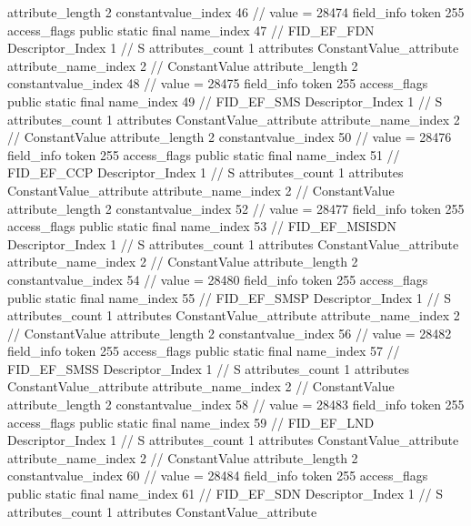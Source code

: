 {{{{{{{					attribute_length	2
					constantvalue_index	46		// value = 28474
				}
				}
			}
			field_info {
				token	255
				access_flags	public static final
				name_index	47		// FID_EF_FDN
				Descriptor_Index	1		// S
				attributes_count	1
				attributes {
				ConstantValue_attribute {
					attribute_name_index	2		// ConstantValue
					attribute_length	2
					constantvalue_index	48		// value = 28475
				}
				}
			}
			field_info {
				token	255
				access_flags	public static final
				name_index	49		// FID_EF_SMS
				Descriptor_Index	1		// S
				attributes_count	1
				attributes {
				ConstantValue_attribute {
					attribute_name_index	2		// ConstantValue
					attribute_length	2
					constantvalue_index	50		// value = 28476
				}
				}
			}
			field_info {
				token	255
				access_flags	public static final
				name_index	51		// FID_EF_CCP
				Descriptor_Index	1		// S
				attributes_count	1
				attributes {
				ConstantValue_attribute {
					attribute_name_index	2		// ConstantValue
					attribute_length	2
					constantvalue_index	52		// value = 28477
				}
				}
			}
			field_info {
				token	255
				access_flags	public static final
				name_index	53		// FID_EF_MSISDN
				Descriptor_Index	1		// S
				attributes_count	1
				attributes {
				ConstantValue_attribute {
					attribute_name_index	2		// ConstantValue
					attribute_length	2
					constantvalue_index	54		// value = 28480
				}
				}
			}
			field_info {
				token	255
				access_flags	public static final
				name_index	55		// FID_EF_SMSP
				Descriptor_Index	1		// S
				attributes_count	1
				attributes {
				ConstantValue_attribute {
					attribute_name_index	2		// ConstantValue
					attribute_length	2
					constantvalue_index	56		// value = 28482
				}
				}
			}
			field_info {
				token	255
				access_flags	public static final
				name_index	57		// FID_EF_SMSS
				Descriptor_Index	1		// S
				attributes_count	1
				attributes {
				ConstantValue_attribute {
					attribute_name_index	2		// ConstantValue
					attribute_length	2
					constantvalue_index	58		// value = 28483
				}
				}
			}
			field_info {
				token	255
				access_flags	public static final
				name_index	59		// FID_EF_LND
				Descriptor_Index	1		// S
				attributes_count	1
				attributes {
				ConstantValue_attribute {
					attribute_name_index	2		// ConstantValue
					attribute_length	2
					constantvalue_index	60		// value = 28484
				}
				}
			}
			field_info {
				token	255
				access_flags	public static final
				name_index	61		// FID_EF_SDN
				Descriptor_Index	1		// S
				attributes_count	1
				attributes {
				ConstantValue_attribute {
}}}}}}}
